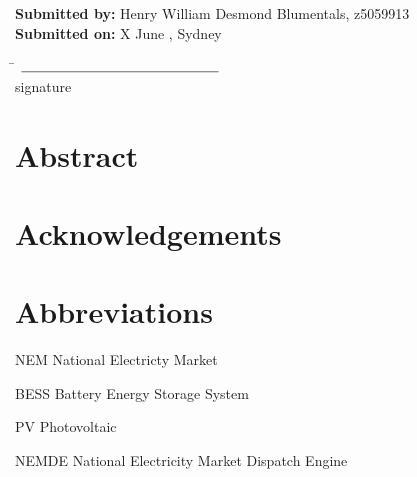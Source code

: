 \documentclass[11pt,fleqn]{book} %
\makeatletter
\newcommand{\tocfill}{\cleaders\hbox{$\m@th \mkern\@dotsep mu . \mkern\@dotsep mu$}\hfill}
\newcommand{\abbrlabel}[1]{\makebox[3cm][l]{\textbf{#1}\ \tocfill}}
\newenvironment{abbreviations}{\begin{list}{}{\renewcommand{\makelabel}{\abbrlabel}%
                                              \setlength{\itemsep}{0pt}}}{\end{list}}
\makeatother
\begin{document}
\noindent
\textbf{Submitted by:} Henry William Desmond Blumentals, z5059913 \\
\textbf{Submitted on:} X June \Year, Sydney \\ %

\noindent

\begin{tabbing}
\AuthorName \= $\rule{5cm}{0.15mm}$\\
\> \hspace*{1.5cm} {\footnotesize signature} \\ %
\end{tabbing}
\hspace{3mm}


\clearpage
\thispagestyle{empty}


\chapter*{Abstract}
\chapter*{Acknowledgements}
\chapter*{Abbreviations}
\par\vspace*{-190\p}
\begin{abbreviations}
\item[NEM] National Electricty Market
\item[BESS] Battery Energy Storage System
\item[PV] Photovoltaic
\item[NEMDE] National Electricity Market Dispatch Engine
\end{abbreviations}
\end{document}

